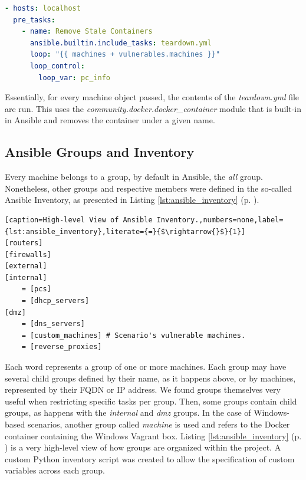 \begin{lstlisting}[language=yaml,caption=Removal of Stale Containers.,numbers=none,label={lst:ansible_removal_of_stale_containers}]
- hosts: localhost
  pre_tasks:
    - name: Remove Stale Containers
      ansible.builtin.include_tasks: teardown.yml
      loop: "{{ machines + vulnerables.machines }}"
      loop_control:
        loop_var: pc_info
\end{lstlisting}

Essentially, for every machine object passed, the contents of the \textit{teardown.yml} file are run. This uses the \textit{community.docker.docker\_container} module that is built-in in Ansible and removes the container under a given name.

\subsection{Ansible Groups and Inventory} \label{sec:ansible_groups_inventory}


Every machine belongs to a group, by default in Ansible, the \textit{all} group. Nonetheless, other groups and respective members were defined in the so-called Ansible Inventory, as presented in Listing \ref{lst:ansible_inventory} (p. \pageref{lst:ansible_inventory}).

\begin{lstlisting}[caption=High-level View of Ansible Inventory.,numbers=none,label={lst:ansible_inventory},literate={=}{$\rightarrow{}$}{1}]
[routers]
[firewalls]
[external]
[internal]
    = [pcs]
    = [dhcp_servers]
[dmz]
    = [dns_servers]
    = [custom_machines] # Scenario's vulnerable machines.
    = [reverse_proxies]
\end{lstlisting}

Each word represents a group of one or more machines. Each group may have several child groups defined by their name, as it happens above, or by machines, represented by their FQDN or IP address. We found groups themselves very useful when restricting specific tasks per group. Then, some groups contain child groups, as happens with the \textit{internal} and \textit{dmz} groups. In the case of Windows-based scenarios, another group called \textit{machine} is used and refers to the Docker container containing the Windows Vagrant box. Listing \ref{lst:ansible_inventory} (p. \pageref{lst:ansible_inventory}) is a very high-level view of how groups are organized within the project. A custom Python inventory script was created to allow the specification of custom variables across each group.


